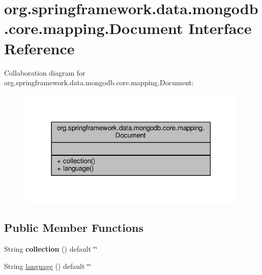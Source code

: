 \hypertarget{interfaceorg_1_1springframework_1_1data_1_1mongodb_1_1core_1_1mapping_1_1Document}{}\section{org.\+springframework.\+data.\+mongodb.\+core.\+mapping.\+Document Interface Reference}
\label{interfaceorg_1_1springframework_1_1data_1_1mongodb_1_1core_1_1mapping_1_1Document}


Collaboration diagram for org.\+springframework.\+data.\+mongodb.\+core.\+mapping.\+Document\+:
\nopagebreak
\begin{figure}[H]
\begin{center}
\leavevmode
\includegraphics[width=314pt]{interfaceorg_1_1springframework_1_1data_1_1mongodb_1_1core_1_1mapping_1_1Document__coll__graph}
\end{center}
\end{figure}
\subsection*{Public Member Functions}
\begin{DoxyCompactItemize}
\item 
\mbox{\label{interfaceorg_1_1springframework_1_1data_1_1mongodb_1_1core_1_1mapping_1_1Document_a0d9a144a76f7daac1f5cd54c76d42a6d}} 
String {\bfseries collection} () default \char`\"{}\char`\"{}
\item 
String \hyperlink{interfaceorg_1_1springframework_1_1data_1_1mongodb_1_1core_1_1mapping_1_1Document_ad679d7be1db53bf98c7c412f777a7e3f}{language} () default \char`\"{}\char`\"{}
\end{DoxyCompactItemize}


